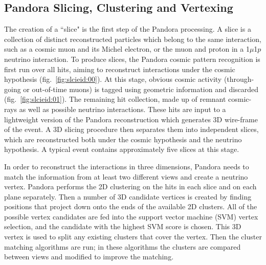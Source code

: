 \subsection{Pandora Slicing, Clustering and Vertexing}
The creation of a ``slice" is the first step of the Pandora processing. A slice is a collection of distinct reconstructed particles which belong to the same interaction, such as a cosmic muon and its Michel electron, or the muon and proton in a 1$\mu$1$p$ neutrino interaction. To produce slices, the Pandora cosmic pattern recognition is first run over all hits, aiming to reconstruct interactions under the cosmic hypothesis (fig.~\ref{fig:slcieid:00}). At this stage, obvious cosmic activity (through-going or out-of-time muons) is tagged using geometric information and discarded (fig.~\ref{fig:slcieid:01}). The remaining hit collection, made up of remnant cosmic-rays as well as possible neutrino interactions. These hits are input to a lightweight version of the Pandora reconstruction which generates 3D wire-frame of the event. A 3D slicing procedure then separates them into independent slices, which are reconstructed both under the cosmic hypothesis and the neutrino hypothesis. A typical event contains approximately five slices at this stage. 

\par In order to reconstruct the interactions in three dimensions, Pandora needs to match the information from at least two different views and create a neutrino vertex. Pandora performs the 2D clustering on the hits in each slice and on each plane separately. Then a number of 3D candidate vertices is created by finding positions that project down onto the ends of the available 2D clusters. All of the possible vertex candidates are fed into the support vector machine (SVM) vertex selection, and the candidate with the highest SVM score is chosen. This 3D vertex is used to split any existing clusters that cover the vertex. Then the cluster matching algorithms are run; in these algorithms the clusters are compared between views and modified to improve the matching.

